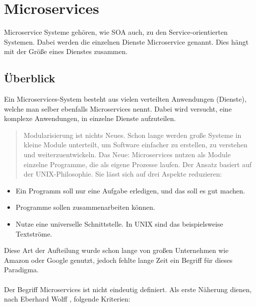 \chapter{Microservices}
\label{chap:Microservices}
Microservice Systeme gehören, wie SOA auch, zu den Service-orientierten Systemen. Dabei werden die einzelnen Dienste Microservice genannt. Dies hängt mit der Größe eines Dienstes zusammen.


\section{Überblick}
\label{sec:überblickMicroservice}
Ein Microservices-System besteht aus vielen verteilten Anwendungen (Dienste), welche man selber ebenfalls Microservices nennt. Dabei wird versucht, eine komplexe Anwendungen, in einzelne Dienste aufzuteilen.

\begin{quotation}
    \frqq Modularisierung ist nichts Neues. Schon lange werden große Systeme in kleine Module unterteilt, um Software einfacher zu erstellen, zu verstehen und weiterzuentwickeln. Das Neue: Microservices nutzen als Module einzelne Programme, die als eigene Prozesse laufen. Der Ansatz basiert auf der UNIX-Philosophie. Sie lässt sich auf drei Aspekte reduzieren:\flqq\cite[S. 2]{EWolff2016:Microservices}
\end{quotation}

\begin{itemize}
    \item Ein Programm soll nur eine Aufgabe erledigen, und das soll es gut machen.
    \item Programme sollen zusammenarbeiten können.
    \item Nutze eine universelle Schnittstelle. In UNIX sind das beispielsweise Textströme.
\end{itemize}
Diese Art der Aufteilung wurde schon lange von großen Unternehmen wie Amazon oder Google genutzt, jedoch fehlte lange Zeit ein Begriff für dieses Paradigma.
\\\\
Der Begriff Microservices ist nicht eindeutig definiert. Als erste Näherung dienen, nach Eberhard Wolff \cite[S. 2]{EWolff2016:Microservices}, folgende Kriterien:

